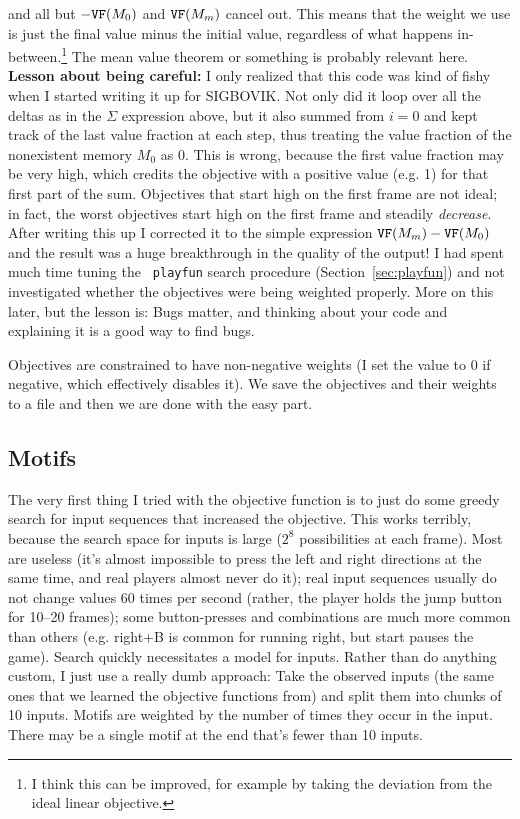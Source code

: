 \documentclass[twocolumn]{article}
\begin{document}
%
and all but $-{\tt VF}(M_0)$ and ${\tt VF}(M_m)$ cancel out. This
means that the weight we use is just the final value minus the initial
value, regardless of what happens in-between.\footnote{I think this
  can be improved, for example by taking the deviation from the ideal
  linear objective.} The mean value theorem or something is probably
relevant here. {\bf Lesson about being careful:} I only realized that
this code was kind of fishy when I started writing it up for SIGBOVIK.
Not only did it loop over all the deltas as in the $\Sigma$ expression
above, but it also summed from $i=0$ and kept track of the last value
fraction at each step, thus treating the value fraction of the
nonexistent memory $M_0$ as 0. This is wrong, because the first value
fraction may be very high, which credits the objective with a positive
value (e.g. 1) for that first part of the sum. Objectives that start
high on the first frame are not ideal; in fact, the worst objectives
start high on the first frame and steadily {\em decrease}. After
writing this up I corrected it to the simple expression ${\tt VF}(M_m)
- {\tt VF}(M_0)$ and the result was a huge breakthrough in the
quality of the output! I had spent much time tuning the {\tt
  playfun} search procedure (Section~\ref{sec:playfun}) and not
investigated whether the objectives were being weighted properly. More
on this later, but the lesson is: Bugs matter, and thinking about your
code and explaining it is a good way to find bugs.

Objectives are constrained to have non-negative weights (I set the
value to 0 if negative, which effectively disables it). We save the
objectives and their weights to a file and then we are done with the
easy part.

\subsection{Motifs} \label{sec:motifs}

The very first thing I tried with the objective function is to just do
some greedy search for input sequences that increased the objective.
This works terribly, because the search space for inputs is large
($2^8$ possibilities at each frame). Most are useless (it's almost
impossible to press the left and right directions at the same time,
and real players almost never do it); real input sequences usually do
not change values 60 times per second (rather, the player holds the
jump button for 10--20 frames); some button-presses and combinations
are much more common than others (e.g. right+B is common for running
right, but start pauses the game). Search quickly necessitates a model
for inputs. Rather than do anything custom, I just use a really dumb
approach: Take the observed inputs (the same ones that we learned the
objective functions from) and split them into chunks of 10 inputs.
Motifs are weighted by the number of times they occur in the input.
There may be a single motif at the end that's fewer than 10 inputs.
\end{document}
